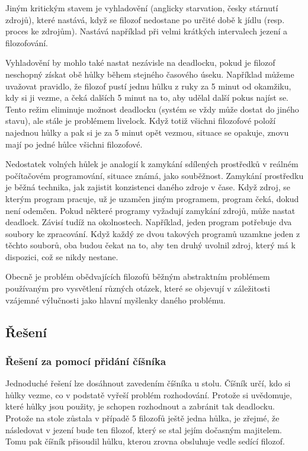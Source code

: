 \documentclass{article}
\begin{document}
Jiným kritickým stavem je vyhladovění (anglicky starvation, česky stárnutí zdrojů), které nastává, když se filozof nedostane po určité době k jídlu (resp. proces ke zdrojům). Nastává například při velmi krátkých intervalech jezení a filozofování.

Vyhladovění by mohlo také nastat nezávisle na deadlocku, pokud je filozof neschopný získat obě hůlky během stejného časového úseku. Například můžeme uvažovat pravidlo, že filozof pustí jednu hůlku z ruky za 5 minut od okamžiku, kdy si ji vezme, a čeká dalších 5 minut na to, aby udělal další pokus najíst se. Tento režim eliminuje možnost deadlocku (systém se vždy může dostat do jiného stavu), ale stále je problémem livelock. Když totiž všichni filozofové položí najednou hůlky a pak si je za 5 minut opět vezmou, situace se opakuje, znovu mají po jedné hůlce všichni filozofové.

Nedostatek volných hůlek je analogií k zamykání sdílených prostředků v reálném počítačovém programování, situace známá, jako souběžnost. Zamykání prostředku je běžná technika, jak zajistit konzistenci daného zdroje v čase. Když zdroj, se kterým program pracuje, už je uzamčen jiným programem, program čeká, dokud není odemčen. Pokud některé programy vyžadují zamykání zdrojů, může nastat deadlock. Závisí tudíž na okolnostech. Například, jeden program potřebuje dva soubory ke zpracování. Když každý ze dvou takových programů uzamkne jeden z těchto souborů, oba budou čekat na to, aby ten druhý uvolnil zdroj, který má k dispozici, což se nikdy nestane.

Obecně je problém obědvajících filozofů běžným abstraktním problémem používaným pro vysvětlení různých otázek, které se objevují v záležitosti vzájemné výlučnosti jako hlavní myšlenky daného problému.

\subsection*{Řešení}

\subsubsection*{Řešení za pomocí přidání číšníka}
Jednoduché řešení lze dosáhnout zavedením číšníka u stolu. Číšník určí, kdo si hůlky vezme, co v podstatě vyřeší problém rozhodování. Protože si uvědomuje, které hůlky jsou použity, je schopen rozhodnout a zabránit tak deadlocku. Protože na stole zůstala v případě 5 filozofů ještě jedna hůlka, je zřejmé, že následovat v jezení bude ten filozof, který se stal jejím dočasným majitelem. Tomu pak číšník přisoudil hůlku, kterou zrovna obsluhuje vedle sedící filozof.
\end{document}
